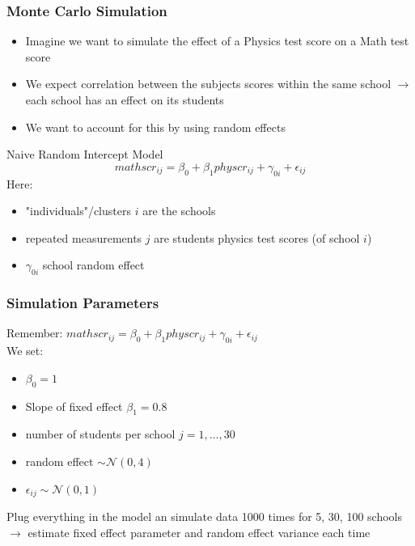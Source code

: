 \documentclass{beamer}
\begin{document}
\begin{frame}
\frametitle{Monte Carlo Simulation}
\begin{itemize}
	\item Imagine we want to simulate the effect of a Physics test score on a Math test score
	\item We expect correlation between the subjects scores within the same school $\rightarrow$ each school has an effect on its students
	\item We want to account for this by using random effects
\end{itemize}
\begin{block}{Naive Random Intercept Model}
\begin{equation}
	mathscr_{ij}=\beta_0 + \beta_1physcr_{ij} + \gamma_{0i} + \epsilon_{ij}
\end{equation}
Here:
\begin{itemize}
\item "individuals"/clusters $i$ are the schools 
\item repeated measurements $j$ are students physics test scores (of school $i$)
\item $\gamma_{0i}$ school random effect
\end{itemize}
\end{block}
\end{frame}

\begin{frame}
\frametitle{Simulation Parameters}
Remember: $mathscr_{ij}=\beta_0 + \beta_1physcr_{ij} + \gamma_{0i} + \epsilon_{ij}$\\
We set:
\begin{itemize}
	\item $\beta_0=1$
	\item Slope of fixed effect $\beta_1=0.8$
	\item number of students per school $j=1,...,30$
	\item random effect $\sim\mathcal{N}(0,4)$
	\item $\epsilon_{ij}\sim\mathcal{N}(0,1)$

\end{itemize}
Plug everything in the model an simulate data 1000 times for 5, 30, 100 schools
$\rightarrow$ estimate fixed effect parameter and random effect variance each time
\end{frame}
\end{document}

